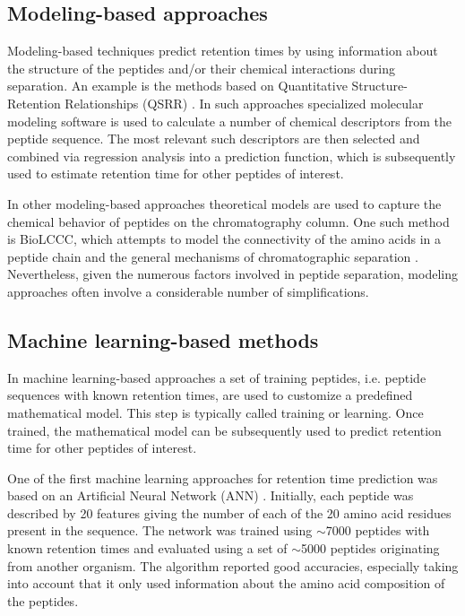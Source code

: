 \documentclass[a4paper]{article}
\begin{document}
\subsection{Modeling-based approaches}

Modeling-based techniques predict retention times by using information
about the structure of the peptides and/or their chemical interactions
during separation. An example is the methods based on Quantitative
Structure-Retention Relationships (QSRR) \cite{Kaliszan2005,
Baczek2005}. In such approaches specialized molecular modeling
software is used to calculate a number of chemical descriptors from
the peptide sequence. The most relevant such descriptors are then
selected and combined via regression analysis into a prediction
function, which is subsequently used to estimate retention time for
other peptides of interest.



In other modeling-based approaches theoretical models are used to
capture the chemical behavior of peptides on the chromatography
column. One such method is BioLCCC, which attempts to model the
connectivity of the amino acids in a peptide chain and the general
mechanisms of chromatographic
separation \cite{gorshkov2006}. Nevertheless, given the numerous
factors involved in peptide separation, modeling approaches often
involve a considerable number of simplifications.

 
\subsection{Machine learning-based methods}

In machine learning-based approaches a set of training peptides,
i.e. peptide sequences with known retention times, are used to
customize a predefined mathematical model. This step is typically
called training or learning. Once trained, the mathematical model can
be subsequently used to predict retention time for other peptides of
interest.



One of the first machine learning approaches for retention time
prediction was based on an Artificial Neural Network
(ANN) \cite{petritis2003}. Initially, each peptide was described by 20
features giving the number of each of the 20 amino acid residues
present in the sequence. The network was trained using $\sim$7000
peptides with known retention times and evaluated using a set of
$\sim$5000 peptides originating from another organism. The algorithm
reported good accuracies, especially taking into account that it only
used information about the amino acid composition of the peptides.
\end{document}
